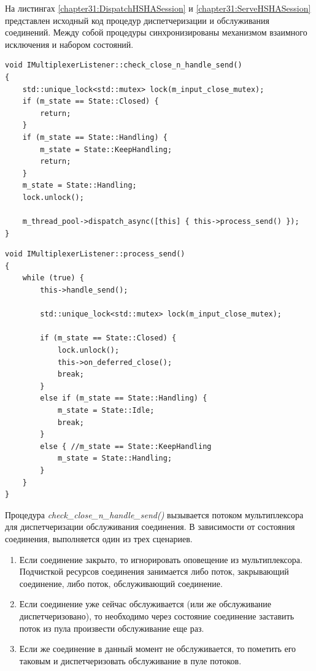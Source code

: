 На листингах \ref{chapter31:DispatchHSHASession} и \ref{chapter31:ServeHSHASession} представлен исходный код процедур диспетчеризации и обслуживания соединений. Между собой процедуры синхронизированы механизмом взаимного исключения и набором состояний.

\begin{lstlisting}[float=!h,caption={Процедура диспетчеризации обслуживания соединения},label={chapter31:DispatchHSHASession},frame=tlrb]
void IMultiplexerListener::check_close_n_handle_send()
{
    std::unique_lock<std::mutex> lock(m_input_close_mutex);
    if (m_state == State::Closed) {
        return;
    }
    if (m_state == State::Handling) {
        m_state = State::KeepHandling;
        return;
    }
    m_state = State::Handling;
    lock.unlock();

    m_thread_pool->dispatch_async([this] { this->process_send() });
}
\end{lstlisting}

\begin{lstlisting}[float=!h,caption={Процедура обслуживания соединения в мультиплексоре оповещений},label={chapter31:ServeHSHASession},frame=tlrb]
void IMultiplexerListener::process_send()
{
    while (true) {
        this->handle_send();	

        std::unique_lock<std::mutex> lock(m_input_close_mutex);
      
        if (m_state == State::Closed) {
            lock.unlock();
            this->on_deferred_close();
            break;
        }
        else if (m_state == State::Handling) {
            m_state = State::Idle;
            break;
        }
        else { //m_state == State::KeepHandling
            m_state = State::Handling;
        }
    }
}
\end{lstlisting}

Процедура \textit{check\_close\_n\_handle\_send()} вызывается потоком мультиплексора для диспетчеризации обслуживания соединения. В зависимости от состояния соединения, выполняется один из трех сценариев.
\begin{enumerate}
\item Если соединение закрыто, то игнорировать оповещение из мультиплексора. Подчисткой ресурсов соединения занимается либо поток, закрывающий соединение, либо поток, обслуживающий соединение.
\item Если соединение уже сейчас обслуживается (или же обслуживание диспетчеризовано), то необходимо через состояние соединение заставить поток из пула произвести обслуживание еще раз.
\item Если же соединение в данный момент не обслуживается, то пометить его таковым и диспетчеризовать обслуживание в пуле потоков.
\end{enumerate}

